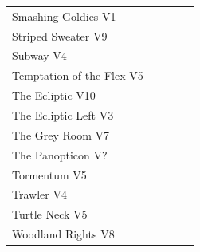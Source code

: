 \begin{flushleft}
\begin{center}
\begin{supertabular}{p{0.76\linewidth}p{0.08\linewidth}}
Smashing Goldies V1 & \pageref{rt:Smashing Goldies} \\
Striped Sweater V9 & \pageref{rt:Striped Sweater} \\
Subway V4 & \pageref{vr:Subway} \\
Temptation of the Flex V5 & \pageref{rt:Temptation of the Flex} \\
The Ecliptic V10 & \pageref{rt:The Ecliptic} \\
The Ecliptic Left V3 & \pageref{rt:The Ecliptic Left} \\
The Grey Room V7 & \pageref{rt:The Grey Room} \\
The Panopticon V? & \pageref{rt:The Panopticon} \\
Tormentum V5 & \pageref{rt:Tormentum} \\
Trawler V4 & \pageref{rt:Trawler} \\
Turtle Neck V5 & \pageref{vr:Turtle Neck} \\
Woodland Rights V8 & \pageref{rt:Woodland Rights} \\
\end{supertabular}
\end{center}
\needspace{1.5cm}

\end{flushleft}
